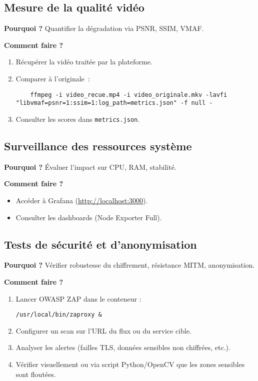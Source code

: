 \documentclass[a4paper,12pt]{article}
\begin{document}
\subsection{Mesure de la qualité vidéo}
\textbf{Pourquoi ?} Quantifier la dégradation via PSNR, SSIM, VMAF.

\textbf{Comment faire ?}
\begin{enumerate}[label=\alph*)]
    \item Récupérer la vidéo traitée par la plateforme.
    \item Comparer à l’originale :
    \begin{verbatim}
    ffmpeg -i video_recue.mp4 -i video_originale.mkv -lavfi "libvmaf=psnr=1:ssim=1:log_path=metrics.json" -f null -
    \end{verbatim}
    \item Consulter les scores dans \texttt{metrics.json}.
\end{enumerate}

\subsection{Surveillance des ressources système}
\textbf{Pourquoi ?} Évaluer l’impact sur CPU, RAM, stabilité.

\textbf{Comment faire ?}
\begin{itemize}
    \item Accéder à Grafana (\url{http://localhost:3000}).
    \item Consulter les dashboards (Node Exporter Full).
\end{itemize}

\subsection{Tests de sécurité et d’anonymisation}
\textbf{Pourquoi ?} Vérifier robustesse du chiffrement, résistance MITM, anonymisation.

\textbf{Comment faire ?}
\begin{enumerate}[label=\alph*)]
    \item Lancer OWASP ZAP dans le conteneur :
    \begin{verbatim}
/usr/local/bin/zaproxy &
    \end{verbatim}
    \item Configurer un scan sur l’URL du flux ou du service cible.
    \item Analyser les alertes (failles TLS, données sensibles non chiffrées, etc.).
    \item Vérifier visuellement ou via script Python/OpenCV que les zones sensibles sont floutées.
\end{enumerate}
\end{document}

